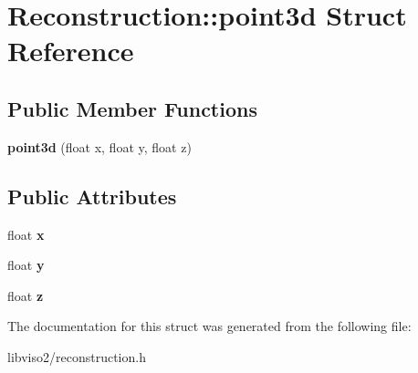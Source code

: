 \hypertarget{struct_reconstruction_1_1point3d}{\section{Reconstruction\+:\+:point3d Struct Reference}
\label{struct_reconstruction_1_1point3d}
}
\subsection*{Public Member Functions}
\begin{DoxyCompactItemize}
\item 
\hypertarget{struct_reconstruction_1_1point3d_a67e779ec8a7df14e4c2a39533e0e10a2}{{\bfseries point3d} (float x, float y, float z)}\label{struct_reconstruction_1_1point3d_a67e779ec8a7df14e4c2a39533e0e10a2}

\end{DoxyCompactItemize}
\subsection*{Public Attributes}
\begin{DoxyCompactItemize}
\item 
\hypertarget{struct_reconstruction_1_1point3d_ab66110baf26112dceb5bdfe196d4cfac}{float {\bfseries x}}\label{struct_reconstruction_1_1point3d_ab66110baf26112dceb5bdfe196d4cfac}

\item 
\hypertarget{struct_reconstruction_1_1point3d_a8babfa0adf6b84bb79d99df88055461f}{float {\bfseries y}}\label{struct_reconstruction_1_1point3d_a8babfa0adf6b84bb79d99df88055461f}

\item 
\hypertarget{struct_reconstruction_1_1point3d_aa0eaffb29c824544bcd9785cc9e9b8cc}{float {\bfseries z}}\label{struct_reconstruction_1_1point3d_aa0eaffb29c824544bcd9785cc9e9b8cc}

\end{DoxyCompactItemize}


The documentation for this struct was generated from the following file\+:\begin{DoxyCompactItemize}
\item 
libviso2/reconstruction.\+h\end{DoxyCompactItemize}
